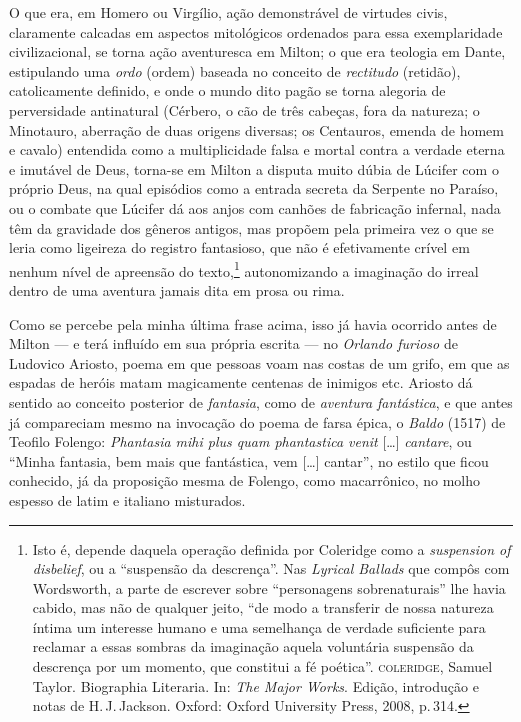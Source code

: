 O que era, em Homero ou Virgílio, ação demonstrável de virtudes civis,
claramente calcadas em aspectos mitológicos ordenados para essa
exemplaridade civilizacional, se torna ação aventuresca em Milton; o que
era teologia em Dante, estipulando uma \emph{ordo} (ordem) baseada no
conceito de \emph{rectitudo} (retidão), catolicamente definido, e onde o
mundo dito pagão se torna alegoria de perversidade antinatural (Cérbero,
o cão de três cabeças, fora da natureza; o Minotauro, aberração de duas
origens diversas; os Centauros, emenda de homem e cavalo) entendida como
a multiplicidade falsa e mortal contra a verdade eterna e imutável de
Deus, torna-se em Milton a disputa muito dúbia de Lúcifer com o próprio
Deus, na qual episódios como a entrada secreta da Serpente no Paraíso,
ou o combate que Lúcifer dá aos anjos com canhões de fabricação
infernal, nada têm da gravidade dos gêneros antigos, mas propõem pela
primeira vez o que se leria como ligeireza do registro fantasioso, que
não é efetivamente crível em nenhum nível de apreensão do
texto,\footnote{Isto é, depende daquela operação definida por Coleridge
  como a \emph{suspension of disbelief}, ou a ``suspensão da
  descrença''. Nas \emph{Lyrical Ballads} que compôs com Wordsworth, a
  parte de escrever sobre ``personagens sobrenaturais'' lhe havia
  cabido, mas não de qualquer jeito, ``de modo a transferir de nossa
  natureza íntima um interesse humano e uma semelhança de verdade
  suficiente para reclamar a essas sombras da imaginação aquela
  voluntária suspensão da descrença por um momento, que constitui a fé
  poética''. \textsc{coleridge}, Samuel Taylor. Biographia Literaria. In:
  \emph{The Major Works}. Edição, introdução e notas de H.\,J.\,Jackson. Oxford: Oxford University
  Press, 2008, p.\,314.} autonomizando a imaginação do irreal dentro de
uma aventura jamais dita em prosa ou rima.

Como se percebe pela minha última frase acima, isso já havia ocorrido
antes de Milton --- e terá influído em sua própria escrita --- no
\emph{Orlando furioso} de Ludovico Ariosto, poema em que
pessoas voam nas costas de um grifo, em que as espadas de heróis matam
magicamente centenas de inimigos etc. Ariosto dá sentido ao conceito
posterior de \emph{fantasia}, como de \emph{aventura fantástica}, e que
antes já compareciam mesmo na invocação do poema de farsa épica, o
\emph{Baldo} (1517) de Teofilo Folengo: \emph{Phantasia mihi
plus quam phantastica venit} [\ldots{}] \emph{cantare}, ou ``Minha fantasia, bem
mais que fantástica, vem [\ldots{}] cantar'', no estilo que ficou conhecido,
já da proposição mesma de Folengo, como macarrônico, no molho
espesso de latim e italiano misturados.

